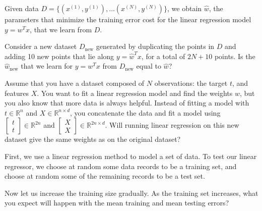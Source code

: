 \documentclass{article}
\newcounter{problem}
\begin{document}
	\begin{problem}[2]
		Given data \(D=\{(x^{(1)},y^{(1)}),\hdots(x^{(N)},y^{(N)})\}\), we obtain \(\hat{w}\), the parameters that minimize the training error cost for the linear regression model \(y=w^Tx\), that we learn from \(D\).
		
		Consider a new dataset \(D_{\text{new}}\) generated by duplicating the points in \(D\) and adding 10 new points that lie along \(y=\hat{w}^Tx\), for a total of \(2N+10\) points. Is the \(\hat{w}_\text{new}\) that we learn for \(y=w^Tx\) from \(D_\text{new}\) equal to \(\hat{w}\)?
	\end{problem}

	\begin{problem}[2]
		Assume that you have a dataset composed of \(N\) observations: the target \(t\), and features \(X\). You want to fit a linear regression model and find the weights \(w\), but you also know that more data is always helpful. Instead of fitting a model with \(t\in\mathbb{R}^n\) and \(X\in\mathbb{R}^{n\times d}\), you concatenate the data and fit a model using \(\displaystyle{\begin{bmatrix}
				t\\
				t
		\end{bmatrix}}\in\mathbb{R}^{2n}\) and \(\displaystyle{\begin{bmatrix}
		X\\
		X
	\end{bmatrix}}\in\mathbb{R}^{2n\times d}\). Will running linear regression on this new dataset give the same weights as on the original dataset?
	\end{problem}

	\begin{problem}[4]
		First, we use a linear regression method to model a set of data. To test our linear regressor, we choose at random some data records to be a training set, and choose at random some of the remaining records to be a test set.
		
		Now let us increase the training size gradually. As the training set increases, what you expect will happen with the mean training and mean testing errors?
	\end{problem}
\end{document}
